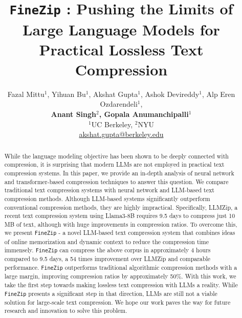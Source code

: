 \documentclass[11pt]{article}
\title{\texttt{FineZip} : Pushing the Limits of Large Language Models for \\ Practical Lossless Text Compression}
\author{Fazal Mittu$^1$, Yihuan Bu$^1$, Akshat Gupta$^1$, Ashok Devireddy$^1$, Alp Eren Ozdarendeli$^1$, \\
\textbf{Anant Singh$^2$, Gopala Anumanchipalli$^1$}\\
$^1$UC Berkeley, $^2$NYU\\
  \small{
   \href{akshat.gupta@berkeley.edu}{akshat.gupta@berkeley.edu}
  }
}
\begin{document}
\maketitle
\begin{abstract}
While the language modeling objective has been shown to be deeply connected with compression, it is surprising that modern LLMs are not employed in practical text compression systems. In this paper, we provide an in-depth analysis of neural network and transformer-based compression techniques to answer this question. We compare traditional text compression systems with neural network and LLM-based text compression methods. Although LLM-based systems significantly outperform conventional compression methods, they are highly impractical. Specifically, LLMZip, a recent text compression system using Llama3-8B requires 9.5 days to compress just 10 MB of text, although with huge improvements in compression ratios. To overcome this, we present \texttt{FineZip} - a novel LLM-based text compression system that combines ideas of online memorization and dynamic context to reduce the compression time immensely. \texttt{FineZip} can compress the above corpus in approximately 4 hours compared to 9.5 days, a 54 times improvement over LLMZip and comparable performance. \texttt{FineZip} outperforms traditional algorithmic compression methods with a large margin, improving compression ratios by approximately 50\%. With this work, we take the first step towards making lossless text compression with LLMs a reality. While  \texttt{FineZip} presents a significant step in that direction, LLMs are still not a viable solution for large-scale text compression. We hope our work paves the way for future research and innovation to solve this problem. 


\end{abstract}
\end{document}
